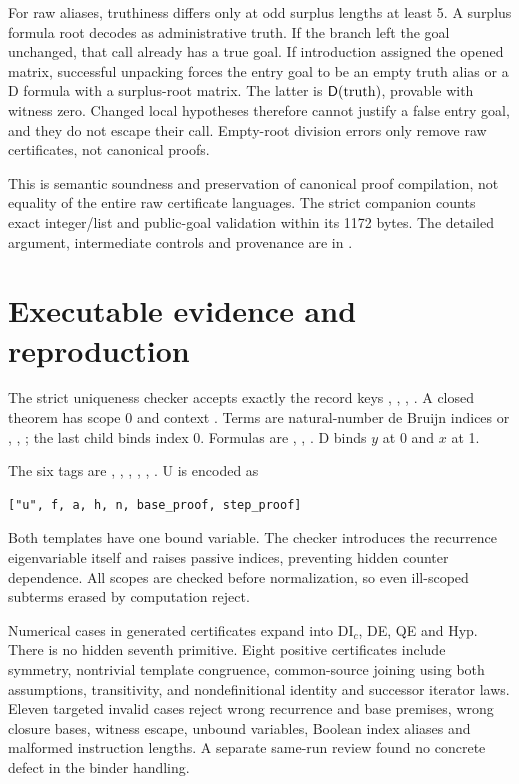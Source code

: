For raw aliases, truthiness differs only at odd surplus lengths at least
5. A surplus formula root decodes as administrative truth. If the
branch left the goal unchanged, that call already has a true goal.
If introduction assigned the opened matrix, successful unpacking forces
the entry goal to be an empty truth alias or a D formula with a
surplus-root matrix. The latter is $\mathsf D(\mathrm{truth})$, provable with
witness zero. Changed local hypotheses therefore cannot justify a false
entry goal, and they do not escape their call. Empty-root division
errors only remove raw certificates, not canonical proofs.

This is semantic soundness and preservation of canonical proof
compilation, not equality of the entire raw certificate languages.
The strict companion counts exact integer/list and public-goal
validation within its 1172 bytes. The detailed argument, intermediate
controls and provenance are in .

\section{Executable evidence and reproduction}
The strict uniqueness checker accepts exactly the record keys
, , , .
A closed theorem has scope 0 and context \file{[]}.
Terms are natural-number de Bruijn indices or
\file{["z"]}, \file{["s",t]}, \file{["i",n,a,h]};
the last child binds index 0.
Formulas are \file{["=",s,t]}, \file{["q",B]}, \file{["d",B]}.
D binds $y$ at 0 and $x$ at 1.

The six tags are , , , ,
, . U is encoded as
\begin{lstlisting}
["u", f, a, h, n, base_proof, step_proof]
\end{lstlisting}
Both templates have one bound variable. The checker introduces the
recurrence eigenvariable itself and raises passive indices, preventing
hidden counter dependence. All scopes are checked before normalization,
so even ill-scoped subterms erased by computation reject.

Numerical cases in generated certificates expand into DI$_c$, DE, QE
and Hyp. There is no hidden seventh primitive. Eight positive
certificates include symmetry, nontrivial template congruence,
common-source joining using both assumptions, transitivity, and
nondefinitional identity and successor iterator laws.
Eleven targeted invalid cases reject wrong recurrence and base premises,
wrong closure bases, witness escape, unbound variables, Boolean index
aliases and malformed instruction lengths. A separate same-run review
found no concrete defect in the binder handling.

